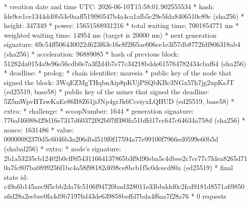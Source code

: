 \begin{shellbox}\begin{ttlst}
* creation date and time UTC: 2026-06-10T15:58:01.902555534
* hash: fde9ce1ce1344dd0b53c0aaff519f80547b4a4ca1afb5c29e5fda8406510c89c (sha256)
* height: 347349
* power: 15651588931216
* total waiting time: 7001854771 ms
* weighted waiting time: 14954 ms (target is 20000 ms)
* next generation signature: 69c54ff506430022d623f63c16c8f2f65ae006ce1e3f57db8772fdf806318ab4 (sha256)
* acceleration: 96889085
* hash of previous block: 51282da0154a9e96e56cdb0e7a3f2d4b7e77c34218bdde615764782434cbaf64 (sha256)
* deadline:
  * prolog:
    * chain identifier: maresia
    * public key of the node that signed the block: 3WqEZMgTHqbnAip8pKUjPSQbKBc3NGx57h7jg2upKsJT (ed25519, base58)
    * public key of the miner that signed the deadline: 5Z5mWpvHTzwKaEe86B8Z61jiJNp4grJk6CceiyxLQHUD (ed25519, base58)
    * extra: 
  * challenge:
    * scoopNumber: 1644
    * generation signature: 776af46088d29d16e7317d60372f82b07ff380fa51bffd17cc647c64634a758d (sha256)
  * nonce: 1631486
  * value: 00000082370d5c6046b3a206dbd519f0f17594a77e99100f7966ed0599e60b5d (shabal256)
  * extra: 
* node's signature: 2b1a53235cb12402b0cff8f54311664137865b3f9d90eba5c4dbee2c7cc77c7fdea8265d710a7fc807ba0899256f1bc4a58f98182d698ce8bcb1f5c0dcecd80a (ed25519)
* final state id: c49a6b145aec9f5cbb2da7fc5106f94720bad328011e33bbddd0c2fcd9181d8571a69850a6d28a2eebec0fa4d9b71976d43de639858beffd7bda4f6aa7f28a76
* 0 requests
\end{ttlst}\end{shellbox}
